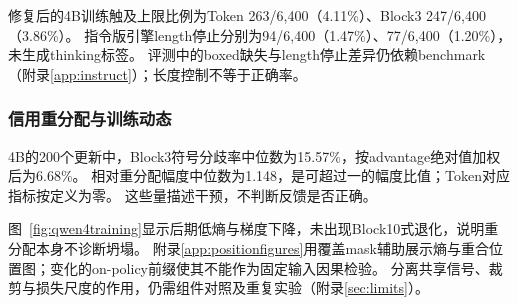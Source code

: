 修复后的4B训练触及上限比例为Token 263/6,400（4.11\%）、Block3 247/6,400（3.86\%）。
指令版引擎length停止分别为94/6,400（1.47\%）、77/6,400（1.20\%），未生成thinking标签。
评测中的boxed缺失与length停止差异仍依赖benchmark（附录\ref{app:instruct}）；长度控制不等于正确率。

\subsubsection{信用重分配与训练动态}
4B的200个更新中，Block3符号分歧率中位数为15.57\%，按advantage绝对值加权后为6.68\%。
相对重分配幅度中位数为1.148，是可超过一的幅度比值；Token对应指标按定义为零。
这些量描述干预，不判断反馈是否正确。

图~\ref{fig:qwen4training}显示后期低熵与梯度下降，未出现Block10式退化，说明重分配本身不诊断坍塌。
附录\ref{app:positionfigures}用覆盖mask辅助展示熵与重合位置图；变化的on-policy前缀使其不能作为固定输入因果检验。
分离共享信号、裁剪与损失尺度的作用，仍需组件对照及重复实验（附录\ref{sec:limits}）。
